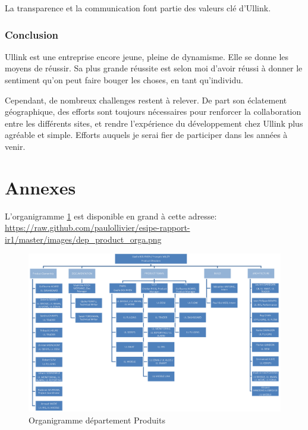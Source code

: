 \documentclass[a4paper, 12pt]{article}
\begin{document}
La transparence et la communication font partie des valeurs clé d'Ullink.

\pagebreak
\section*{Conclusion}

Ullink est une entreprise encore jeune, pleine de dynamisme. Elle se donne les moyens de réussir. Sa plus grande réussite est selon moi d'avoir réussi à donner le sentiment qu'on peut faire bouger les choses, en tant qu'individu.

Cependant, de nombreux challenges restent à relever. De part son éclatement géographique, des efforts sont toujours nécessaires pour renforcer la collaboration entre les différents sites, et rendre l'expérience du développement chez Ullink plus agréable et simple. Efforts auquels je serai fier de participer dans les années à venir.

\pagebreak

\part*{Annexes}
L'organigramme \ref{Product_dpts_orga} est disponible en grand à cette adresse: \url{https://raw.github.com/paulollivier/esipe-rapport-ir1/master/images/dep_product_orga.png}
\begin{figure}
\includegraphics[width=525pt, angle=90]{dep_product_orga.png}
\caption{Organigramme département Produits}
\label{Product_dpts_orga}
\end{figure}
\end{document}
